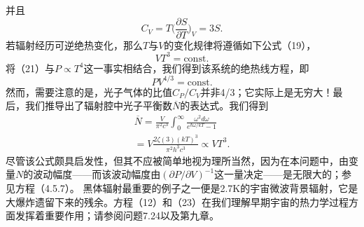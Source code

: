 并且
\begin{equation}\tag{7.2.30}\label{eq:7.2.30}
C _ { V } = T \biggl ( \frac { \partial S } { \partial T } \biggr ) _ { V } = 3 S .
\end{equation}
若辐射经历可逆绝热变化，那么\(T\)与\(V\)的变化规律将遵循如下公式（19），
\begin{equation}\tag{7.2.31}\label{eq:7.2.31}
V T ^{3} = \mathrm { c o n s t . }
\end{equation}
将（21）与\(P \propto T^{4}\)这一事实相结合，我们得到该系统的绝热线方程，即
\begin{equation}\tag{7.2.32}\label{eq:7.2.32}
P V ^{4 / 3} = \mathrm { c o n s t . }
\end{equation}
然而，需要注意的是，光子气体的比值\(C_{P}/C_{V}\)并非4/3；它实际上是无穷大！最后，我们推导出了辐射腔中光子平衡数\(\overline{N}\)的表达式。我们得到
\begin{equation}\tag{7.2.33}\label{eq:7.2.33}
\begin{array}{r} { \overline { { N } } = \frac { V } { \pi ^{2} c ^{3} } \int _ { 0 } ^{\infty} \frac { \omega ^{2} d \omega } { e ^{\hbar \omega / k T} - 1 } } \\{ = V \frac { 2 \zeta ( 3 ) ( k T ) ^{3} } { \pi ^{2} h ^{3} c ^{3} } \propto V T ^{3} . } \end{array}
\end{equation}
尽管该公式颇具启发性，但其不应被简单地视为理所当然，因为在本问题中，由变量\(N\)的波动幅度——而该波动幅度由\((\partial P/\partial V)^{-1}\)这一量决定——是无限大的；参见方程（4.5.7）。
黑体辐射最重要的例子之一便是2.7K的宇宙微波背景辐射，它是大爆炸遗留下来的残余。方程（12）和（23）在我们理解早期宇宙的热力学过程方面发挥着重要作用；请参阅问题7.24以及第九章。
